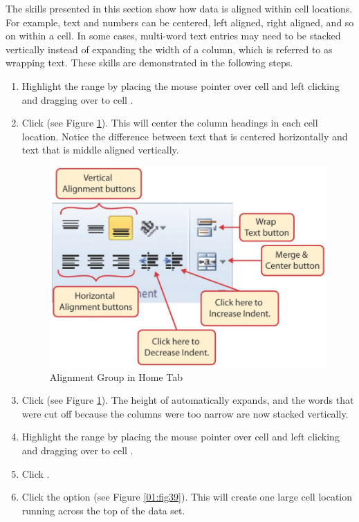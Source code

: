 The skills presented in this section show how data is aligned within cell locations. For example, text and numbers can be centered, left aligned, right aligned, and so on within a cell. In some cases, multi-word text entries may need to be stacked vertically instead of expanding the width of a column, which is referred to as wrapping text. These skills are demonstrated in the following steps.

\begin{enumbox}
	\begin{enumerate}
		\item Highlight the range  by placing the mouse pointer over cell  and left clicking and dragging over to cell .
		\item Click  (see Figure \ref{01:fig38}). This will center the column headings in each cell location. Notice the difference between text that is centered horizontally and text that is middle aligned vertically.

		\begin{figure}[H]
			\centering
			\includegraphics[width=\maxwidth{.95\linewidth}]{gfx/ch01_fig38}
			\caption{Alignment Group in Home Tab}
			\label{01:fig38}
		\end{figure}

		\item Click  (see Figure \ref{01:fig38}). The height of  automatically expands, and the words that were cut off because the columns were too narrow are now stacked vertically.
		\item Highlight the range  by placing the mouse pointer over cell  and left clicking and dragging over to cell .
		\item Click .
		\item Click the  option (see Figure \ref{01:fig39}). This will create one large cell location running across the top of the data set.
	\end{enumerate}
\end{enumbox}
	
